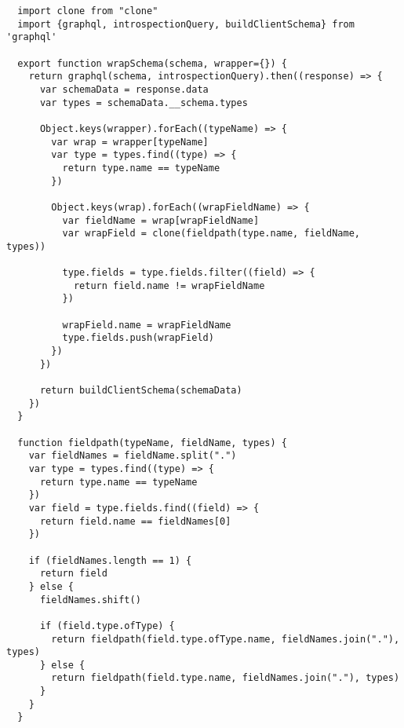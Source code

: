 \begin{verbatim}
  import clone from "clone"
  import {graphql, introspectionQuery, buildClientSchema} from 'graphql'

  export function wrapSchema(schema, wrapper={}) {
    return graphql(schema, introspectionQuery).then((response) => {
      var schemaData = response.data
      var types = schemaData.__schema.types

      Object.keys(wrapper).forEach((typeName) => {
        var wrap = wrapper[typeName]
        var type = types.find((type) => {
          return type.name == typeName
        })

        Object.keys(wrap).forEach((wrapFieldName) => {
          var fieldName = wrap[wrapFieldName]
          var wrapField = clone(fieldpath(type.name, fieldName, types))

          type.fields = type.fields.filter((field) => {
            return field.name != wrapFieldName
          })

          wrapField.name = wrapFieldName
          type.fields.push(wrapField)
        })
      })

      return buildClientSchema(schemaData)
    })
  }

  function fieldpath(typeName, fieldName, types) {
    var fieldNames = fieldName.split(".")
    var type = types.find((type) => {
      return type.name == typeName
    })
    var field = type.fields.find((field) => {
      return field.name == fieldNames[0]
    })

    if (fieldNames.length == 1) {
      return field
    } else {
      fieldNames.shift()

      if (field.type.ofType) {
        return fieldpath(field.type.ofType.name, fieldNames.join("."), types)
      } else {
        return fieldpath(field.type.name, fieldNames.join("."), types)
      }
    }
  }
\end{verbatim}
